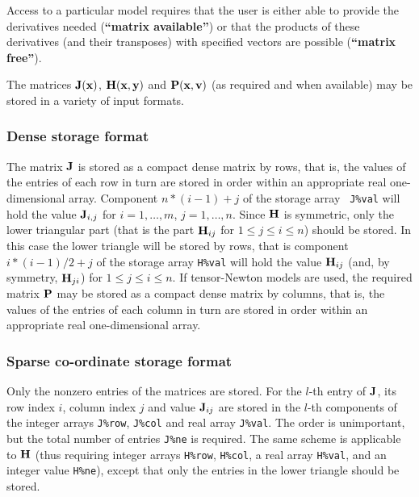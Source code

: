 \documentclass{galahad}
\begin{document}
\noindent
Access to a particular model requires that the user is either able to
provide the derivatives needed ({\bf ``matrix available''}) or that the products
of these derivatives (and their transposes) with specified vectors are possible
({\bf ``matrix free''}).


\galmatrix The matrices ${\mathbf{J}}({\mathbf{x}})$, ${\mathbf{H}}({\mathbf{x}},{\mathbf{y}})$ and ${\mathbf{P}}({\mathbf{x}},{\mathbf{v}})$
(as required and when available) may be stored in a variety of input formats.

\subsubsection{Dense storage format}\label{dense}
The matrix ${\mathbf{J}}$ is stored as a compact
dense matrix by rows, that is, the values of the entries of each row in turn are
stored in order within an appropriate real one-dimensional array.
Component $n \ast (i-1) + j$ of the storage array {\tt
  J\%val} will hold the value ${\mathbf{J}}_{i,j}$ for $i = 1, \ldots , m$, $j =
1, \ldots , n$.  Since ${\mathbf{H}}$ is symmetric, only the lower triangular
part (that is the part ${\mathbf{H}}_{ij}$ for $1 \leq j \leq i \leq n$)
should be stored. In this case the lower triangle will be stored by rows,
that is component $i \ast (i-1)/2 + j$ of the storage array {\tt H\%val} will
hold the value ${\mathbf{H}}_{ij}$ (and, by symmetry, ${\mathbf{H}}_{ji}$) for $1 \leq j
\leq i \leq n$. If tensor-Newton models are used, the required matrix ${\mathbf{P}}$
may be stored as a compact dense matrix by columns, that is, the values of
the entries of each column in turn are stored in order within an appropriate
real one-dimensional array.

\subsubsection{Sparse co-ordinate storage format}\label{coordinate}
Only the nonzero entries of the matrices are stored. For the $l$-th
entry of ${\mathbf{J}}$, its row index $i$, column index $j$ and value
${\mathbf{J}}_{ij}$ are stored in the $l$-th components of the integer arrays
{\tt J\%row}, {\tt J\%col} and real array {\tt J\%val}.
The order is unimportant, but the total number of entries {\tt J\%ne} is
required.  The same scheme is applicable to ${\mathbf{H}}$
(thus requiring integer arrays {\tt H\%row}, {\tt H\%col}, a real
array {\tt H\%val}, and an integer value {\tt H\%ne}), except that only
the entries in the lower triangle should be stored.
\end{document}
